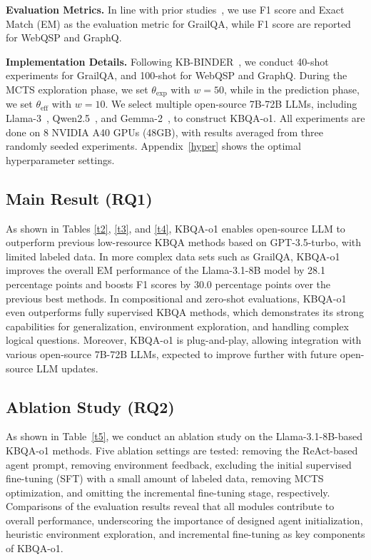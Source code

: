 \documentclass{article}
\theoremstyle{plain}
\theoremstyle{definition}
\theoremstyle{remark}
\begin{document}
\textbf{Evaluation Metrics. }
In line with prior studies~\citep{KB-BINDER,KB-Coder,ARG-KBQA}, we use F1 score and Exact Match (EM) as the evaluation metric for GrailQA, while F1 score are reported for WebQSP and GraphQ.

\textbf{Implementation Details. }
Following KB-BINDER~\citep{KB-BINDER}, we conduct 40-shot experiments for GrailQA, and 100-shot for WebQSP and GraphQ. 
During the MCTS exploration phase, we set $\theta_{\text{exp}}$ with $w=50$, while in the prediction phase, we set  $\theta_{\text{eff}}$ with $w = 10$. 
We select multiple open-source 7B-72B LLMs, including Llama-3~\cite{llama3}, Qwen2.5~\cite{Qwen2.5}, and Gemma-2~\cite{Gemma2}, to construct KBQA-o1.
All experiments are done on 8 NVIDIA A40 GPUs (48GB), with results averaged from three randomly seeded experiments. 
Appendix~\ref{hyper} shows the optimal hyperparameter settings.


\subsection{Main Result (RQ1)}
As shown in Tables \ref{t2}, \ref{t3}, and \ref{t4}, KBQA-o1 enables open-source LLM to outperform previous low-resource KBQA methods based on GPT-3.5-turbo, with limited labeled data. In more complex data sets such as GrailQA, KBQA-o1 improves the overall EM performance of the Llama-3.1-8B model by 28.1 percentage points and boosts F1 scores by 30.0 percentage points over the previous best methods. In compositional and zero-shot evaluations, KBQA-o1 even outperforms fully supervised KBQA methods, which demonstrates its strong capabilities for generalization, environment exploration, and handling complex logical questions. Moreover, KBQA-o1 is plug-and-play, allowing integration with various open-source 7B-72B LLMs, expected to improve further with future open-source LLM updates.

\subsection{Ablation Study (RQ2)}
As shown in Table~\ref{t5}, we conduct an ablation study on the Llama-3.1-8B-based KBQA-o1 methods. Five ablation settings are tested: removing the ReAct-based agent prompt, removing environment feedback, excluding the initial supervised fine-tuning (SFT) with a small amount of labeled data, removing MCTS optimization, and omitting the incremental fine-tuning stage, respectively. Comparisons of the evaluation results reveal that all modules contribute to overall performance, underscoring the importance of designed agent initialization, heuristic environment exploration, and incremental fine-tuning as key components of KBQA-o1.
\end{document}
